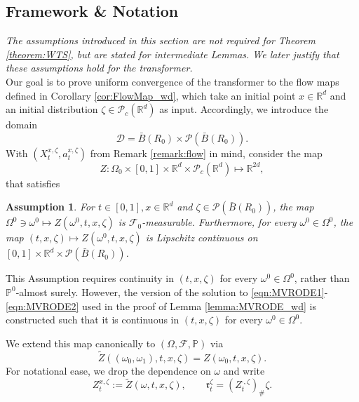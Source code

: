 \documentclass{article}
\newtheorem{assumption}{Assumption}
\newcommand{\R}{\mathbb{R}}
\begin{document}
\begin{appendices}
\section{Framework \& Notation}\label{App:G}
\textit{The assumptions introduced in this section are not required for Theorem \ref{theorem:WTS}, but are stated for intermediate Lemmas. We later justify that these assumptions hold for the transformer.}\\

Our goal is to prove uniform convergence of the transformer to the flow maps defined in Corollary \ref{cor:FlowMap_wd}, which take an initial point $x\in\R^d$ and an initial distribution $\zeta\in \mathcal P_c(\R^d)$ as input. Accordingly, we introduce the domain 
\begin{equation}\label{eqn:Domain}
    \mathscr{D} = \bar B(R_0)\times \mathcal P(\bar B(R_0)).
\end{equation}
With $(X^{x,\zeta}_t,a^{x,\zeta}_t)$ from Remark \ref{remark:flow} in mind, consider the map
$$Z:\Omega_0\times [0,1]\times\R^{d}\times \mathcal P_c(\R^d)\mapsto \R^{2d},$$
that satisfies
\begin{assumption}\label{assm:cont}
For $t\in[0,1],x \in \R^d$ and $\zeta\in \mathcal P(\bar B(R_0))$, the map $\Omega^0\ni\omega^0\mapsto Z(\omega^0,t,x,\zeta)$ is $\mathcal F_0$-measurable. Furthermore, for every $\omega^0\in \Omega^0$, the map $(t,x,\zeta)\mapsto Z(\omega^0,t,x,\zeta)$ is Lipschitz continuous on $[0,1]\times \R^d\times \mathcal P(\bar B(R_0))$.
\end{assumption}
This Assumption requires continuity in $(t,x,\zeta)$ for every $\omega^0\in\Omega^0$, rather than $\mathbb P^0$-almost surely. However, the version of the solution to \eqref{eqn:MVRODE1}-\eqref{eqn:MVRODE2} used in the proof of Lemma \ref{lemma:MVRODE_wd} is constructed such that it is continuous in $(t,x,\zeta)$ for every $\omega^0\in\Omega^0$.

We extend this map canonically to $(\Omega,\mathcal F,\mathbb P)$ via
\[
\widetilde{Z}((\omega_0,\omega_1),t,x,\zeta) = Z(\omega_0,t,x,\zeta).\]
 For notational ease, we drop the dependence on $\omega$ and write
\begin{equation}\label{eqn:mathfrak_r}
Z^{x,\zeta}_t:= \widetilde{Z}(\omega,t,x,\zeta), \qquad\mathfrak{r}^\zeta_t=(Z^{\cdot,\zeta}_t)_\#\zeta.
\end{equation}


\end{appendices}
\end{document}
